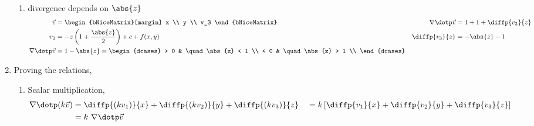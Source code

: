 \begin{enumerate}
\begin{enumerate}
              \item divergence depends on $ \abs{z} $
                    \begin{align} \vec{v}                     & =
              \begin{bNiceMatrix}[margin]
                                      x \\ y \\ v_3
                                  \end{bNiceMatrix} &
              \nabla \dotp \vec{v}        & = 1 + 1 + \diffp{v_3}{z}                  \\
              v_3                         & = -z \left( 1 + \frac{\abs{z}}{2} \right)
              + c + f(x, y)               &
              \diffp{v_3}{z}              & = -\abs{z} - 1                            \\
              \nabla \dotp \vec{v}        & = 1 - \abs{z} =
              \begin{dcases}
                                      > 0 & \quad \abs{z} < 1 \\
                                      < 0 & \quad \abs{z} > 1 \\
                                  \end{dcases}
                    \end{align}
          \end{enumerate}

    \item Proving the relations,
          \begin{enumerate}
              \item Scalar multiplication,
                    \begin{align}
                        \nabla \dotp (k\vec{v}) & = \diffp{(kv_1)}{x}
                        + \diffp{(kv_2)}{y}
                        + \diffp{(kv_3)}{z}     &
                                                & = k \left[ \diffp{v_1}{x}
                            + \diffp{v_2}{y}
                        + \diffp{v_3}{z} \right]                            \\
                                                & = k\ \nabla \dotp \vec{v}
                    \end{align}


\end{enumerate}
\end{enumerate}

